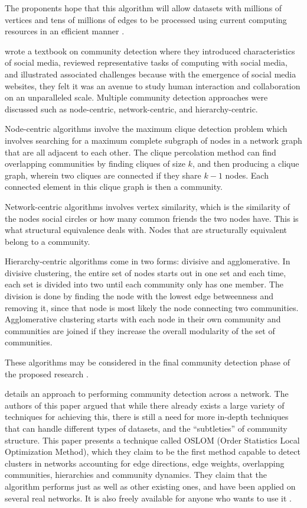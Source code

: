 The proponents hope that this algorithm will allow datasets with millions of vertices and tens of millions of edges to be processed using current computing resources in an efficient manner \cite{Clauset:2004}.

 wrote a textbook on community detection where they introduced characteristics of social media, reviewed representative tasks of computing with social media, and illustrated associated challenges because with the emergence of social media websites, they felt it was an avenue to study human interaction and collaboration on an unparalleled scale. Multiple community detection approaches were discussed such as node-centric, network-centric, and hierarchy-centric. 

Node-centric algorithms involve the maximum clique detection problem which involves searching for a maximum complete subgraph of nodes in a network graph that are all adjacent to each other. The clique percolation method can find overlapping communities by finding cliques of size $k$, and then producing a clique graph, wherein two cliques are connected if they share $k-1$ nodes. Each connected element in this clique graph is then a community.

Network-centric algorithms involves vertex similarity, which is the similarity of the node\vtick s social circles or how many common friends the two nodes have. This is what structural equivalence deals with. Nodes that are structurally equivalent belong to a community. 

Hierarchy-centric algorithms come in two forms: divisive and agglomerative. In divisive clustering, the entire set of nodes starts out in one set and each time, each set is divided into two until each community only has one member. The division is done by finding the node with the lowest edge betweenness and removing it, since that node is most likely the node connecting two communities. Agglomerative clustering starts with each node in their own community and communities are joined if they increase the overall modularity of the set of communities. 

These algorithms may be considered in the final community detection phase of the proposed research \cite{Tang:2010}.

 details an approach to performing community detection across a network. The authors of this paper argued that while there already exists a large variety of techniques for achieving this, there is still a need for more in-depth techniques that can handle different types of datasets, and the ``subtleties'' of community structure. This paper presents a technique called OSLOM (Order Statistics Local Optimization Method), which they claim to be the  first method capable to detect clusters in networks accounting for edge directions, edge weights, overlapping communities, hierarchies and community dynamics. They claim that the algorithm performs just as well as other existing ones, and have been applied on several real networks. It is also freely available for anyone who wants to use it \cite{Lancichinetti:2011}.

